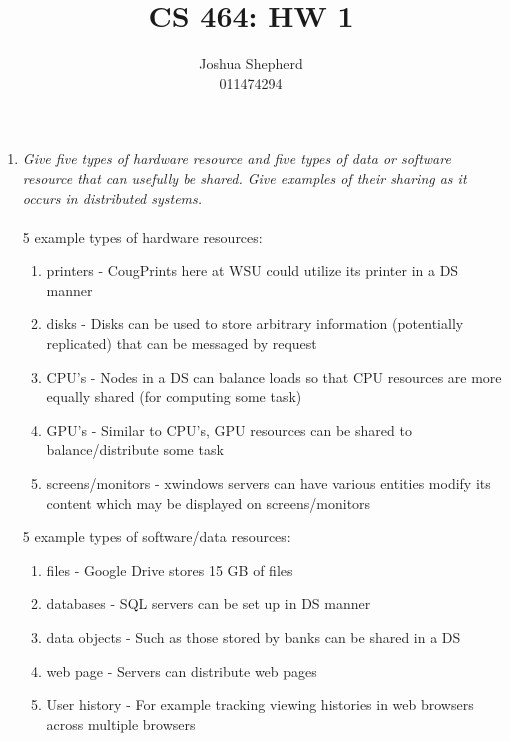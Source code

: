 \documentclass[11pt]{article}
\theoremstyle{plain}
\theoremstyle{definition}
\begin{document}
 


\title{CS 464: HW 1}
\author{Joshua Shepherd\\011474294}
\maketitle


\begin{enumerate}
	\item \textit{Give five types of hardware resource and five types of data or software resource that can usefully be shared. Give examples of their sharing as it occurs in distributed systems.} \\
	\\
	5 example types of hardware resources:
	\begin{enumerate}[\hspace{0.5cm}(1)]
		\item printers - CougPrints here at WSU could utilize its printer in a DS manner
		\item disks - Disks can be used to store arbitrary information (potentially replicated) that can be messaged by request
		\item CPU's - Nodes in a DS can balance loads so that CPU resources are more equally shared (for computing some task)
		\item GPU's - Similar to CPU's, GPU resources can be shared to balance/distribute some task
		\item screens/monitors - xwindows servers can have various entities modify its content which may be displayed on screens/monitors
	\end{enumerate}
	5 example types of software/data resources:
	\begin{enumerate}[\hspace{0.5cm}(1)]
		\item files - Google Drive stores 15 GB of files 
		\item databases - SQL servers can be set up in DS manner
		\item data objects - Such as those stored by banks can be shared in a DS
		\item web page - Servers can distribute web pages
		\item User history - For example tracking viewing histories in web browsers across multiple browsers
		
	\end{enumerate}
	

\end{enumerate}
\end{document}
